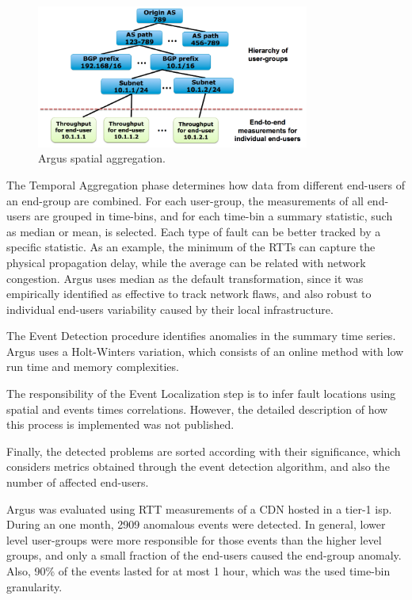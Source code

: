 \begin{figure}[H]
    \centering
    \includegraphics[width=0.8\textwidth]{./figures/literature_review/argus_spatial_aggregation.png}
    \caption{Argus spatial aggregation.~\cite{argus_end_to_end_service_anomaly_detection_and_localization_from_an_isps_point_of_view}}
\label{fig:argus_spatial_aggregation}
\end{figure}%

The Temporal Aggregation phase determines how data
from different end-users of an end-group are combined.
For each user-group, the
measurements of all end-users are grouped in time-bins, and for each
time-bin a summary statistic, such as median or mean, is selected.
Each type of fault can be better tracked by a specific statistic.
As an example, the
minimum of the RTTs can capture the physical propagation delay,
while the average can be related with network congestion. Argus uses median
as the default transformation, since it was empirically identified as
effective to track network flaws, and also robust to individual
end-users variability caused by their local infrastructure.

The Event Detection procedure identifies anomalies in the
summary time series. Argus uses a Holt-Winters variation,  which consists of
an online
method with low run time and memory complexities.

The responsibility of the Event Localization step is to infer fault locations
using spatial and events times correlations.
However, the detailed description of how this
process is implemented was not published.

Finally, the detected problems are sorted according with
their significance, which considers metrics obtained
through the event detection
algorithm, and also the number of affected end-users.

Argus was evaluated using RTT measurements of a CDN hosted in a tier-1 \gls*{isp}\@.
During an one month, 2909 anomalous events were detected.
In general, lower level user-groups were more responsible
for those events than the higher level groups,
and only a small fraction of the end-users caused the end-group anomaly.
Also, 90\% of the events lasted for
at most 1 hour, which was the used time-bin granularity.

